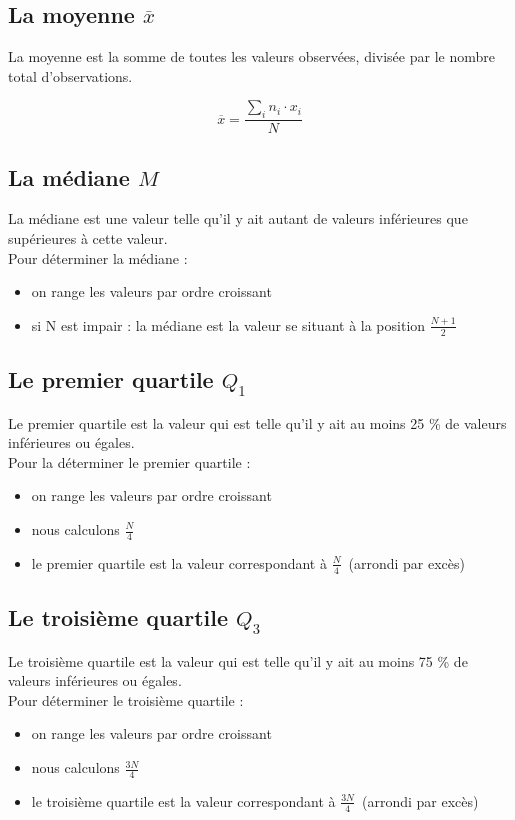 \documentclass[utf8, a4paper, 12 pt]{article}
\begin{document}
    \subsection{La moyenne \(\overline{x}\)}
    La moyenne est la somme de toutes les valeurs observées, divisée par le nombre total 
    d'observations.

    \[\overline{x} =\frac{ \sum_{i} {n_i\cdot x_i} }{N}\]

    \subsection{La médiane $M$}
    La médiane est une valeur telle qu'il y ait autant de valeurs inférieures 
    que supérieures à cette valeur.\\
    Pour déterminer la médiane :\begin{itemize}
        \item on range les valeurs par ordre croissant
        \item si N est impair : la médiane est la valeur se situant à la position \(\frac{N+1}{2}\)
    \end{itemize} \vspace{1\baselineskip}
    \subsection{Le premier quartile $Q_1$}
    Le premier quartile est la valeur qui est telle qu'il y ait au moins 25 \% de valeurs inférieures ou égales.\\
    Pour la déterminer le premier quartile :\begin{itemize}
        \item on range les valeurs par ordre croissant
        \item nous calculons  $\frac{N}{4}$\
        \item le premier quartile est la valeur correspondant à $\frac{N}{4}$\  (arrondi par excès)   
    \end{itemize} \vspace{1\baselineskip}

    \subsection{Le troisième quartile $Q_3$}
    Le troisième quartile est la valeur qui est telle qu'il y ait au moins 75 \% de valeurs inférieures ou égales.\\
    Pour déterminer le troisième quartile :\begin{itemize}
        \item on range les valeurs par ordre croissant
        \item nous calculons  $\frac{3N}{4}$\
        \item le troisième quartile est la valeur correspondant à $\frac{3N}{4}$\  (arrondi par excès)    
    \end{itemize} \vspace{1\baselineskip}
\end{document}
